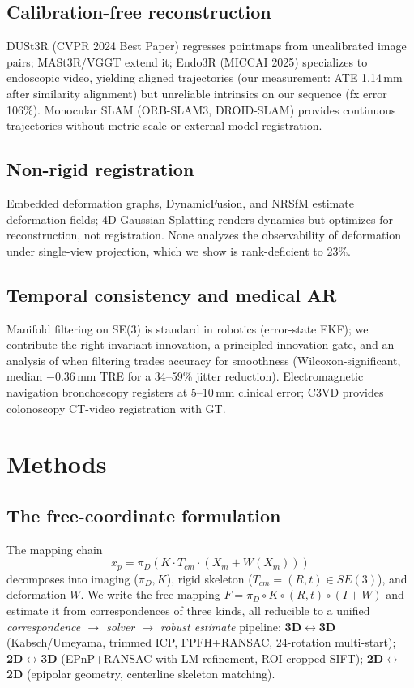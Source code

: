 \documentclass[journal]{IEEEtran}
\begin{document}
\subsection{Calibration-free reconstruction}
DUSt3R (CVPR 2024 Best Paper) regresses pointmaps from uncalibrated image pairs; MASt3R/VGGT extend it; Endo3R (MICCAI 2025) specializes to endoscopic video, yielding aligned trajectories (our measurement: ATE 1.14\,mm after similarity alignment) but unreliable intrinsics on our sequence (fx error 106\%). Monocular SLAM (ORB-SLAM3, DROID-SLAM) provides continuous trajectories without metric scale or external-model registration.

\subsection{Non-rigid registration}
Embedded deformation graphs, DynamicFusion, and NRSfM estimate deformation fields; 4D Gaussian Splatting renders dynamics but optimizes for reconstruction, not registration. None analyzes the observability of deformation under single-view projection, which we show is rank-deficient to 23\%.

\subsection{Temporal consistency and medical AR}
Manifold filtering on SE(3) is standard in robotics (error-state EKF); we contribute the right-invariant innovation, a principled innovation gate, and an analysis of when filtering trades accuracy for smoothness (Wilcoxon-significant, median $-0.36$\,mm TRE for a 34--59\% jitter reduction). Electromagnetic navigation bronchoscopy registers at 5--10\,mm clinical error; C3VD provides colonoscopy CT-video registration with GT.

\section{Methods}
\subsection{The free-coordinate formulation}
The mapping chain
\begin{equation}
x_p = \pi_D\!\left(K\cdot T_{cm}\cdot (X_m + W(X_m))\right)
\end{equation}
decomposes into imaging ($\pi_D, K$), rigid skeleton ($T_{cm}=(R,t)\in SE(3)$), and deformation $W$. We write the free mapping $F=\pi_D\circ K\circ(R,t)\circ(I+W)$ and estimate it from correspondences of three kinds, all reducible to a unified \emph{correspondence $\to$ solver $\to$ robust estimate} pipeline: \textbf{3D$\leftrightarrow$3D} (Kabsch/Umeyama, trimmed ICP, FPFH+RANSAC, 24-rotation multi-start); \textbf{2D$\leftrightarrow$3D} (EPnP+RANSAC with LM refinement, ROI-cropped SIFT); \textbf{2D$\leftrightarrow$2D} (epipolar geometry, centerline skeleton matching).
\end{document}
